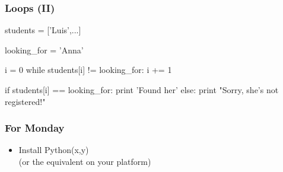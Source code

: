 \begin{frame}[fragile]
\frametitle{Loops (II)}

\begin{python}

students = ['Luis',...]

looking_for = 'Anna'

i = 0
while students[i] != looking_for:
    i += 1

if students[i] == looking_for:
    print 'Found her'
else:
    print "Sorry, she's not registered!"
\end{python}

\end{frame}

\begin{frame}
\frametitle{For Monday}

\begin{itemize}
\item Install Python(x,y)\\
    (or the equivalent on your platform)
\end{itemize}
\end{frame}


